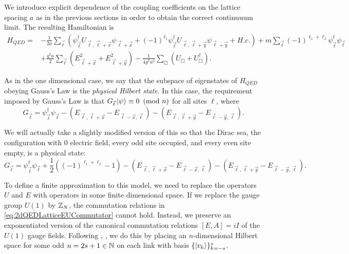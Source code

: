 \documentclass[10pt,reqno]{amsart}
\numberwithin{equation}{section}
\begin{document}
	We introduce explicit dependence of the coupling coefficients on the lattice spacing $a$ as in the previous sections in order to obtain the correct continuuum limit.
	The resulting Hamiltonian is
	\begin{align}\label{eq:2dQEDHamiltonianLatticeDepend}
	H_{QED}=&-\frac{1}{2a}\sum_{\vec{\ell}} \left( \psi^\dagger_{\vec{\ell}} U_{\vec{\ell},\vec{\ell}+\vec{x}} \psi_{\vec{\ell}+\vec{x}} + (-1)^{\ell_1} \psi^\dagger_{\vec{\ell}}U_{\vec{\ell},\vec{\ell}+\vec{y}} \psi_{\vec{\ell}+\vec{y}} + H.c. \right) + m\sum_{\vec{\ell}} (-1)^{\ell_1+\ell_2} \psi_{\vec{\ell}}^\dagger \psi_{\vec{\ell}} \nonumber \\
	&+ \frac{g^2a}{2} \sum_{\vec{\ell}} \left(E^2_{\vec{\ell}+\vec{x}}+E^2_{\vec{\ell}+\vec{y}}\right) - \frac{1}{4g^2a^3} \sum_{\Box} (U_\Box + U_\Box^\dagger).
	\end{align}	
	
	As in the one dimensional case, we say that the subspace of eigenstates of $H_{QED}$ obeying Gauss's Law is the \emph{physical Hilbert state}. 
	In this case, the requirement imposed by Gauss's Law is that $G_{\vec{\ell}}\ket{\psi} \equiv 0 \ \left(\mathrm{mod}\ n\right)$ for all sites $\ell$, where
	\begin{equation}
		G_{\vec{\ell}}=\psi_{\vec{\ell}}^\dagger\psi_{\vec{\ell}} - ( E_{\vec{\ell},\vec{\ell}+\vec{x}} - E_{\vec{\ell}-\vec{x},\vec{\ell}}) - ( E_{\vec{\ell},\vec{\ell}+\vec{y}} - E_{\vec{\ell}-\vec{y},\vec{\ell}} ).
	\end{equation}
	
	We will actually take a slightly modified version of this so that the Dirac sea, the configuration with 0 electric field, every odd site occupied, and every even site empty, is a physical state:
	\begin{equation}\label{eq:2dQEDGaussLaw}
		G_{\vec{\ell}}=\psi_{\vec{\ell}}^\dagger\psi_{\vec{\ell}} + \frac{1}{2}((-1)^{\ell_1+\ell_2}-1) - ( E_{\vec{\ell},\vec{\ell}+\vec{x}} - E_{\vec{\ell}-\vec{x},\vec{\ell}}) - ( E_{\vec{\ell},\vec{\ell}+\vec{y}} - E_{\vec{\ell}-\vec{y},\vec{\ell}} ).
	\end{equation}
	
	To define a finite approximation to this model, we need to replace the operators $U$ and $E$ with operators in some finite dimensional space. 
	If we replace the gauge group $U(1)$ by $\mathbb{Z}_N$, the commutation relations in \cref{eq:2dQEDLatticeEUCommutator} cannot hold.
	Instead, we preserve an exponentiated version of the canonical commutation relations $[E,A]=iI$ of the $U(1)$ gauge fields.
	Following \cite{Ercolessi18}, \cite{Notarnicola15}, we do this by placing an $n$-dimensional Hilbert space for some odd $n=2s+1\in \mathbb{N}$ on each link with basis $\{\ket{v_k}\}_{k=-s}^{s}$.
	
\end{document}
